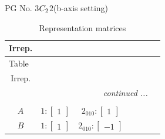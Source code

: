 \documentclass[fleqn,8pt,landscape]{jsarticle}
\begin{document}
\setcounter{MaxMatrixCols}{32}

\renewcommand{\tablename}{Table~}
\renewcommand{\figurename}{Figure~}
\begin{center}
\LARGE
PG No. 3\quad$C_{\rm 2}$\quad$2$\quad(b-axis setting)\quad[ monoclinic ]
\end{center}
\renewcommand{\arraystretch}{1.2}
\begin{longtable}{ccccccc}
\caption{Representation matrices}
 \\
 \hline \hline
Irrep. &  &  &  &  &  &  \\ \hline \endfirsthead

\multicolumn{6}{l}{\tablename\ \thetable{}} \\
 \hline \hline
Irrep. &  &  &  &  &  &  \\ \hline \endhead

 \hline \hline
\multicolumn{6}{r}{\footnotesize\it continued ...} \\ \endfoot

 \hline \hline
\multicolumn{6}{r}{} \\ \endlastfoot

$ A $ & $ 1:\begin{bmatrix} 1 \end{bmatrix} $ & $ 2{}_{010}:\begin{bmatrix} 1 \end{bmatrix} $ \\ \hline
$ B $ & $ 1:\begin{bmatrix} 1 \end{bmatrix} $ & $ 2{}_{010}:\begin{bmatrix} -1 \end{bmatrix} $ \\
\end{longtable}
\end{document}
